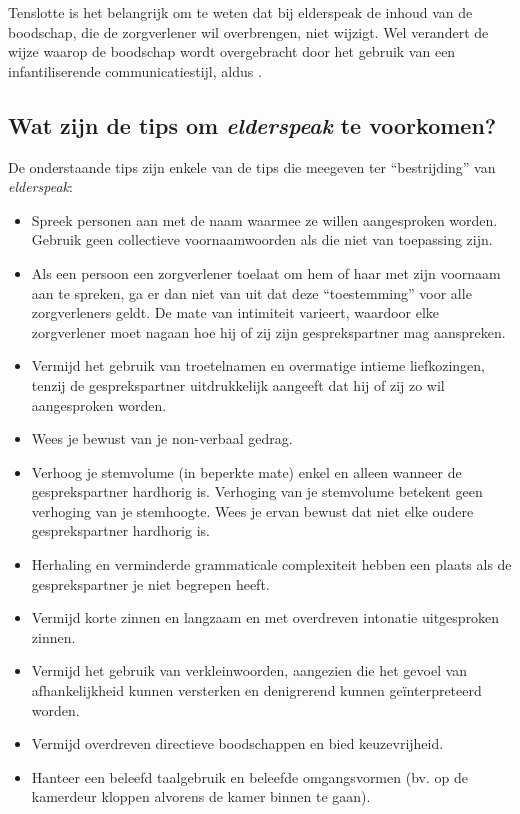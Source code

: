 Tenslotte is het belangrijk om te weten dat bij elderspeak de inhoud van de boodschap, die de zorgverlener wil overbrengen, niet wijzigt. Wel verandert de wijze waarop de boodschap wordt overgebracht door het gebruik van een infantiliserende communicatiestijl, aldus \textcite{Campens21}.

\subsection{Wat zijn de tips om \textit{elderspeak} te voorkomen?}

De onderstaande tips zijn enkele van de tips die \textcite{Wick2007} meegeven ter ``bestrijding'' van \textit{elderspeak}:

\begin{itemize}
    \item Spreek personen aan met de naam waarmee ze willen aangesproken worden. Gebruik geen collectieve voornaamwoorden als die niet van toepassing zijn.
    \item Als een persoon een zorgverlener toelaat om hem of haar met zijn voornaam aan te spreken, ga er dan niet van uit dat deze “toestemming” voor alle zorgverleners geldt. De mate van intimiteit varieert, waardoor elke zorgverlener moet nagaan hoe hij of zij zijn gesprekspartner mag aanspreken.
    \item Vermijd het gebruik van troetelnamen en overmatige intieme liefkozingen, tenzij de gesprekspartner uitdrukkelijk aangeeft dat hij of zij zo wil aangesproken worden.
    \item Wees je bewust van je non-verbaal gedrag.
    \item Verhoog je stemvolume (in beperkte mate) enkel en alleen wanneer de gesprekspartner hardhorig is. Verhoging van je stemvolume betekent geen verhoging van je stemhoogte. Wees je ervan bewust dat niet elke oudere gesprekspartner hardhorig is.
    \item Herhaling en verminderde grammaticale complexiteit hebben een plaats als de gesprekspartner je niet begrepen heeft.
    \item Vermijd korte zinnen en langzaam en met overdreven intonatie uitgesproken zinnen.
    \item Vermijd het gebruik van verkleinwoorden, aangezien die het gevoel van afhankelijkheid kunnen versterken en denigrerend kunnen geïnterpreteerd worden.
    \item Vermijd overdreven directieve boodschappen en bied keuzevrijheid.
    \item Hanteer een beleefd taalgebruik en beleefde omgangsvormen (bv. op de kamerdeur kloppen alvorens de kamer binnen te gaan).
\end{itemize}

